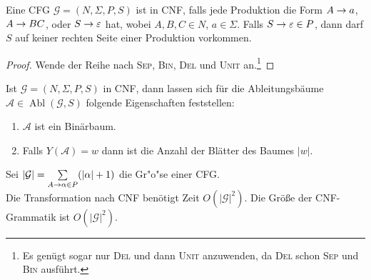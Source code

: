 \begin{Def}[name={[\acs*{CFG} in \acs*{CNF}]}]
	Eine \ac{CFG} $\mathcal{G} = (N, \Sigma, P, S)$ ist in \ac{CNF}, falls jede
  Produktion die Form $A\->a$, $A\->BC$, oder $S \-> \Eps$ hat, wobei $A,B,C\in N$, $a\in\Sigma$.
  Falls $S \to \varepsilon \in P$, dann darf $S$ auf keiner rechten Seite einer Produktion vorkommen.
\end{Def}
\begin{proof}
    Wende der Reihe nach \textsc{Sep}, \textsc{Bin}, \textsc{Del} und \textsc{Unit} an.\footnote{Es genügt sogar nur \textsc{Del} und dann \textsc{Unit} anzuwenden, da \textsc{Del} schon \textsc{Sep} und \textsc{Bin} ausführt.}
\end{proof}

\begin{Beobachtung}
  Ist $\mathcal{G} = (N, \Sigma, P, S)$ in CNF, dann lassen sich für die Ableitungsbäume $\mathcal{A} \in \operatorname{Abl}(\mathcal{G}, S)$ folgende Eigenschaften feststellen:
  \begin{enumerate}
  \item $\mathcal{A}$ ist ein Binärbaum.
  \item Falls $Y(\mathcal{A}) = w$ dann ist die Anzahl der Blätter des Baumes $|w|$.
  \end{enumerate}
\end{Beobachtung}
	
\begin{Bemerkung} Sei $|\mathcal{G}|=\sum\limits_{A\->\alpha\in P}(|\alpha|+1)$ die Gr"o"se einer CFG.\\
Die Transformation nach \ac{CNF} benötigt Zeit $O(|\mathcal{G}|^2)$. Die Größe der \ac{CNF}-Grammatik ist $O(|\mathcal{G}|^2)$.
\end{Bemerkung}

